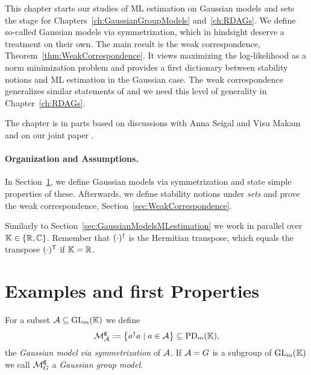 





This chapter starts our studies of ML estimation on Gaussian models and sets the stage for Chapters~\ref{ch:GaussianGroupModels} and~\ref{ch:RDAGs}. We define so-called Gaussian models via symmetrization, which in hindsight deserve a treatment on their own. The main result is the weak correspondence, Theorem~\ref{thm:WeakCorrespondence}. It views maximizing the log-likelihood as a norm minimization problem and provides a first dictionary between stability notions and ML estimation in the Gaussian case. The weak correspondence  generalizes similar statements of \cite{SiagaPaper} and we need this level of generality in Chapter~\ref{ch:RDAGs}.

The chapter is in parts based on discussions with Anna Seigal and Visu Makam and on our joint paper \cite[Appendix~A]{RDAG}.



\paragraph{Organization and Assumptions.}
In Section~\ref{sec:IntroGaussianModels}, we define Gaussian models via symmetrization and state simple properties of these. Afterwards, we define stability notions under \emph{sets} and prove the weak correspondence, Section~\ref{sec:WeakCorrespondence}.

Similarly to Section~\ref{sec:GaussianModelsMLestimation} we work in parallel over 
$\mathbb K \in \{\mathbb R, \mathbb C\}$. Remember that $(\cdot)^{\dagger}$ is the Hermitian transpose, which equals the transpose $(\cdot)^{\mathsf{T}}$ if $\mathbb K = \mathbb R$.




\section{Examples and first Properties}\label{sec:IntroGaussianModels}


\begin{defn}\label{defn:GaussianModelMA}
	For a subset $\mathcal{A} \subseteq \operatorname{GL}_m(\mathbb K)$ we define
		\begin{equation}\label{eq:GaussianModelMA}
			\mathcal{M}^{\mathtt{g}}_{\mathcal{A}} := \left\lbrace a^{\dagger} a \mid a \in \mathcal{A} \right\rbrace \subseteq \operatorname{PD}_m(\mathbb K),
		\end{equation}
	the \emph{Gaussian model via symmetrization} of $\mathcal{A}$. If $\mathcal{A} = G$ is a subgroup of $\operatorname{GL}_m(\mathbb K)$ we call $\mathcal{M}^{\mathtt{g}}_{G}$ a \emph{Gaussian group model}.
	\hfill{}
\end{defn}

